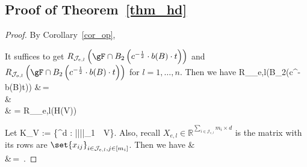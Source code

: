 \documentclass[twoside,11pt]{article}
\begin{document}
\subsection{Proof of Theorem~\ref{thm_hd}}
\begin{proof}
By Corollary~\ref{cor_op}, 




It suffices to get  $R_{\mathcal{J}_{e,l}}\left(\gF\cap B_2\left(c^{-\frac{1}{2}}\cdot b(B)\cdot t\right)\right)$ and  $ R_{\mathcal{J}_{o,l}}\left(\gF\cap B_2\left(c^{-\frac{1}{2}}\cdot b(B)\cdot t\right)\right)$ for $l = 1, \dots, n$.   
Then we have 
\bea 
R_{_{e,l}}\left(\gF\cap B_2\left(c^{-}\cdot b(B)\cdot t\right)\right) &\,=\, \\
& \leq {}\\
& = R_{_{e,l}}\left(H(V)\right)
\bea 
 
Let
\bea
K_V := \{\beta \in {}^d : ||\beta||_1 \,\leq\, V\}.
\bea
Also, recall $X_{e,l} \in \mathbb{R}^{\sum_{i\in \mathcal{J}_{e,l}}m_i\times d} $ is the matrix with its rows are $\set{x_{ij}}_{i\in \mathcal{J}_{e,l},j\in [m_i]}$.
Then we have 
\beq 
\label{eq_lasso}
 &\leq {} \left[ \frac{V}{\sum_{i \in \mathcal{J}_{e,l}}  m_i} \sup_{\beta \in K_1} \sum_{i \in \mathcal{J}_{e,l}} \sum_{j=1}^{m_i} s_{ij} {x_{ij}^*}'\beta \right] \\
&\,=\,    .
\beq 




\end{proof}
\end{document}
